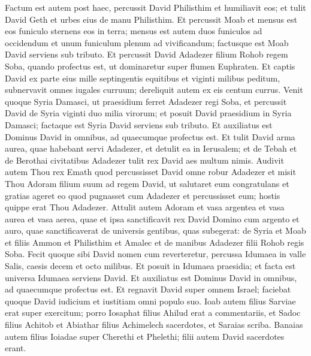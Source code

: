 \begin{biblechapter}
\begin{biblechapter}
\begin{biblechapter}
\begin{biblechapter}
\begin{biblechapter}
\begin{biblechapter}
\begin{biblechapter}
\begin{biblechapter}
\verse Factum est autem post haec, percussit David Philisthim et humiliavit eos; et tulit David Geth et urbes eius de manu Philisthim. 
\verse Et percussit Moab et mensus est eos funiculo sternens eos in terra; mensus est autem duos funiculos ad occidendum et unum funiculum plenum ad vivificandum; factusque est Moab David serviens sub tributo. 
\verse Et percussit David Adadezer filium Rohob regem Soba, quando profectus est, ut dominaretur super flumen Euphraten. 
\verse Et captis David ex parte eius mille septingentis equitibus et viginti milibus peditum, subnervavit omnes iugales curruum; dereliquit autem ex eis centum currus. 
\verse Venit quoque Syria Damasci, ut praesidium ferret Adadezer regi Soba, et percussit David de Syria viginti duo milia virorum; 
\verse et posuit David praesidium in Syria Damasci; factaque est Syria David serviens sub tributo. Et auxiliatus est Dominus David in omnibus, ad quaecumque profectus est. 
\verse Et tulit David arma aurea, quae habebant servi Adadezer, et detulit ea in Ierusalem; 
\verse et de Tebah et de Berothai civitatibus Adadezer tulit rex David aes multum nimis.
 \verse Audivit autem Thou rex Emath quod percussisset David omne robur Adadezer 
 \verse et misit Thou Adoram filium suum ad regem David, ut salutaret eum congratulans et gratias ageret eo quod pugnasset cum Adadezer et percussisset eum; hostis quippe erat Thou Adadezer. Attulit autem Adoram et vasa argentea et vasa aurea et vasa aerea, 
\verse quae et ipsa sanctificavit rex David Domino cum argento et auro, quae sanctificaverat de universis gentibus, quas subegerat: 
 \verse de Syria et Moab et filiis Ammon et Philisthim et Amalec et de manibus Adadezer filii Rohob regis Soba.
 \verse Fecit quoque sibi David nomen cum reverteretur, percussa Idumaea in valle Salis, caesis decem et octo milibus. 
\verse Et posuit in Idumaea praesidia; et facta est universa Idumaea serviens David. Et auxiliatus est Dominus David in omnibus, ad quaecumque profectus est.
 \verse Et regnavit David super omnem Israel; faciebat quoque David iudicium et iustitiam omni populo suo. 
\verse Ioab autem filius Sarviae erat super exercitum; porro Iosaphat filius Ahilud erat a commentariis, 
\verse et Sadoc filius Achitob et Abiathar filius Achimelech sacerdotes, et Saraias scriba. 
 \verse Banaias autem filius Ioiadae super Cherethi et Phelethi; filii autem David sacerdotes erant.
 

\end{biblechapter}
\end{biblechapter}
\end{biblechapter}
\end{biblechapter}
\end{biblechapter}
\end{biblechapter}
\end{biblechapter}
\end{biblechapter}
